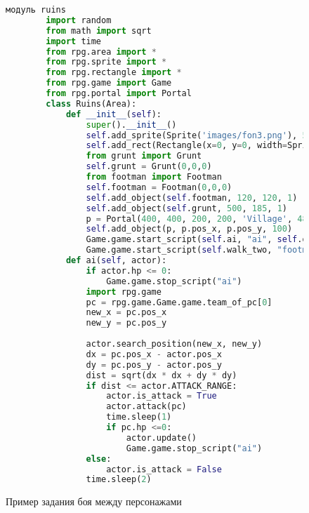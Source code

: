 \begin{figure}[H]
	\begin{lstlisting}[language=Python]
		модуль ruins
		import random
		from math import sqrt
		import time
		from rpg.area import *
		from rpg.sprite import *
		from rpg.rectangle import *
		from rpg.game import Game
		from rpg.portal import Portal
		class Ruins(Area):
			def __init__(self):
				super().__init__()
				self.add_sprite(Sprite('images/fon3.png'), 590, 400, 0)
				self.add_rect(Rectangle(x=0, y=0, width=Sprite('images/fon3.png').image.width(), height=Sprite('images/fon3.png').image.height()))
				from grunt import Grunt
				self.grunt = Grunt(0,0,0)
				from footman import Footman
				self.footman = Footman(0,0,0)
				self.add_object(self.footman, 120, 120, 1)
				self.add_object(self.grunt, 500, 185, 1)
				p = Portal(400, 400, 200, 200, 'Village', 480, 100)
				self.add_object(p, p.pos_x, p.pos_y, 100)
				Game.game.start_script(self.ai, "ai", self.grunt)
				Game.game.start_script(self.walk_two, "footman", 50, 50)	
			def ai(self, actor):
				if actor.hp <= 0:
					Game.game.stop_script("ai")
				import rpg.game
				pc = rpg.game.Game.game.team_of_pc[0]
				new_x = pc.pos_x
				new_y = pc.pos_y
				
				actor.search_position(new_x, new_y)
				dx = pc.pos_x - actor.pos_x
				dy = pc.pos_y - actor.pos_y
				dist = sqrt(dx * dx + dy * dy)
				if dist <= actor.ATTACK_RANGE:
					actor.is_attack = True
					actor.attack(pc)
					time.sleep(1)
					if pc.hp <=0:
						actor.update()
						Game.game.stop_script("ai")
				else:
					actor.is_attack = False
				time.sleep(2)
\end{lstlisting}  
\caption{Пример задания боя между персонажами}
\label{battle2:image}
\end{figure}

